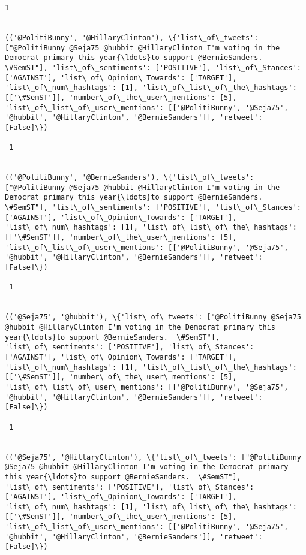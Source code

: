 \documentclass[11pt]{article}
\begin{document}
\begin{Verbatim}[commandchars=\\\{\}]
 1
 

(('@PolitiBunny', '@HillaryClinton'), \{'list\_of\_tweets': ["@PolitiBunny @Seja75 @hubbit @HillaryClinton I'm voting in the Democrat primary this year{\ldots}to support @BernieSanders.  \#SemST"], 'list\_of\_sentiments': ['POSITIVE'], 'list\_of\_Stances': ['AGAINST'], 'list\_of\_Opinion\_Towards': ['TARGET'], 'list\_of\_num\_hashtags': [1], 'list\_of\_list\_of\_the\_hashtags': [['\#SemST']], 'number\_of\_the\_user\_mentions': [5], 'list\_of\_list\_of\_user\_mentions': [['@PolitiBunny', '@Seja75', '@hubbit', '@HillaryClinton', '@BernieSanders']], 'retweet': [False]\})

 1
 

(('@PolitiBunny', '@BernieSanders'), \{'list\_of\_tweets': ["@PolitiBunny @Seja75 @hubbit @HillaryClinton I'm voting in the Democrat primary this year{\ldots}to support @BernieSanders.  \#SemST"], 'list\_of\_sentiments': ['POSITIVE'], 'list\_of\_Stances': ['AGAINST'], 'list\_of\_Opinion\_Towards': ['TARGET'], 'list\_of\_num\_hashtags': [1], 'list\_of\_list\_of\_the\_hashtags': [['\#SemST']], 'number\_of\_the\_user\_mentions': [5], 'list\_of\_list\_of\_user\_mentions': [['@PolitiBunny', '@Seja75', '@hubbit', '@HillaryClinton', '@BernieSanders']], 'retweet': [False]\})

 1
 

(('@Seja75', '@hubbit'), \{'list\_of\_tweets': ["@PolitiBunny @Seja75 @hubbit @HillaryClinton I'm voting in the Democrat primary this year{\ldots}to support @BernieSanders.  \#SemST"], 'list\_of\_sentiments': ['POSITIVE'], 'list\_of\_Stances': ['AGAINST'], 'list\_of\_Opinion\_Towards': ['TARGET'], 'list\_of\_num\_hashtags': [1], 'list\_of\_list\_of\_the\_hashtags': [['\#SemST']], 'number\_of\_the\_user\_mentions': [5], 'list\_of\_list\_of\_user\_mentions': [['@PolitiBunny', '@Seja75', '@hubbit', '@HillaryClinton', '@BernieSanders']], 'retweet': [False]\})

 1
 

(('@Seja75', '@HillaryClinton'), \{'list\_of\_tweets': ["@PolitiBunny @Seja75 @hubbit @HillaryClinton I'm voting in the Democrat primary this year{\ldots}to support @BernieSanders.  \#SemST"], 'list\_of\_sentiments': ['POSITIVE'], 'list\_of\_Stances': ['AGAINST'], 'list\_of\_Opinion\_Towards': ['TARGET'], 'list\_of\_num\_hashtags': [1], 'list\_of\_list\_of\_the\_hashtags': [['\#SemST']], 'number\_of\_the\_user\_mentions': [5], 'list\_of\_list\_of\_user\_mentions': [['@PolitiBunny', '@Seja75', '@hubbit', '@HillaryClinton', '@BernieSanders']], 'retweet': [False]\})


\end{Verbatim}
\end{document}
